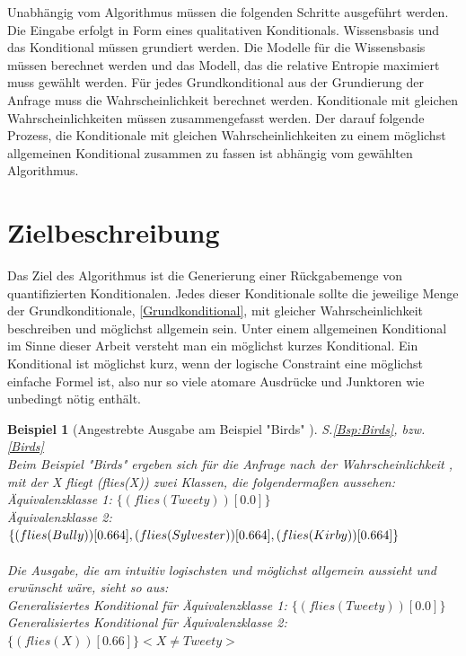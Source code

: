 \documentclass[a4paper, 11pt]{book}
\newtheorem{Bsp}{Beispiel}[section]
\begin{document}
Unabhängig vom Algorithmus müssen die folgenden Schritte ausgeführt werden. Die Eingabe erfolgt in Form eines qualitativen Konditionals. Wissensbasis und das Konditional müssen grundiert werden. Die Modelle für die Wissensbasis müssen berechnet werden und das Modell, das die relative Entropie maximiert muss gewählt werden. Für jedes Grundkonditional aus der Grundierung der Anfrage muss die Wahrscheinlichkeit berechnet werden. Konditionale mit gleichen Wahrscheinlichkeiten müssen zusammengefasst werden. Der darauf folgende Prozess, die Konditionale mit gleichen Wahrscheinlichkeiten zu einem möglichst allgemeinen Konditional zusammen zu fassen ist abhängig vom gewählten Algorithmus.

\section{Zielbeschreibung} \label{Zielbeschreibung}                                                                                                                                                                   
Das Ziel des Algorithmus ist die Generierung einer Rückgabemenge von quantifizierten Konditionalen. Jedes dieser Konditionale sollte die jeweilige Menge der Grundkonditionale, \ref{Grundkonditional}, mit gleicher Wahrscheinlichkeit beschreiben und möglichst allgemein sein. Unter einem allgemeinen Konditional im Sinne dieser Arbeit versteht man ein möglichst kurzes Konditional. Ein Konditional ist möglichst kurz, wenn der logische Constraint eine möglichst einfache Formel ist, also nur so viele atomare Ausdrücke und Junktoren wie unbedingt nötig enthält.


\begin{Bsp}[Angestrebte Ausgabe am Beispiel "{}Birds"{} ]
	\label{Ausgabe_Birds}
S.\ref{Bsp:Birds}, bzw.  \ref{Birds}\\
	Beim Beispiel "{}Birds"{} ergeben sich für die Anfrage nach der Wahrscheinlichkeit , mit der X fliegt (flies(X)) zwei Klassen, die folgendermaßen aussehen:\\
	
	\noindent
			Äquivalenzklasse 1: $\{(flies(Tweety))[0.0]\}$\\
			Äquivalenzklasse 2: $\{(flies(Bully))[0.664], (flies(Sylvester))[0.664],\\ (flies(Kirby))[0.664]\}$\\
			\\
			Die Ausgabe, die am intuitiv logischsten und möglichst allgemein aussieht und erwünscht wäre, sieht so aus:\\
			   	Generalisiertes Konditional für Äquivalenzklasse 1: $\{(flies(Tweety))[0.0]\}$\\
				Generalisiertes Konditional für Äquivalenzklasse 2: $\{(flies(X))[0.66]\} <X \neq Tweety>$\\
\end{Bsp}
\end{document}
